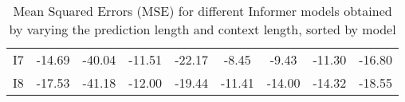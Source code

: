 \begin{table}[ht]
{\begin{tabular}{ccccccccc}
    \cellcolor[HTML]{FFFFFF}I7 & \cellcolor[HTML]{FAE983}-14.69 & \cellcolor[HTML]{9ECF7E}-40.04 & \cellcolor[HTML]{FCA878}-11.51 & \cellcolor[HTML]{FDB57A}-22.17 & \cellcolor[HTML]{FA8070}-8.45  & \cellcolor[HTML]{FDB77A}-9.43  & \cellcolor[HTML]{FED680}-11.30 & \cellcolor[HTML]{FEC97E}-16.80 \\
    \cellcolor[HTML]{FFFFFF}I8 & \cellcolor[HTML]{9CCE7E}-17.53 & \cellcolor[HTML]{71C27B}-41.18 & \cellcolor[HTML]{FDEA83}-12.00 & \cellcolor[HTML]{FA8471}-19.44 & \cellcolor[HTML]{FBE983}-11.41 & \cellcolor[HTML]{E5E382}-14.00 & \cellcolor[HTML]{C1D980}-14.32 & \cellcolor[HTML]{EFE683}-18.55 \\
    \end{tabular}%
    }
    \caption{Mean Squared Errors (MSE) for different Informer models obtained by varying the prediction length and context length, sorted by model}
    \label{I1_M}
    \end{table}

